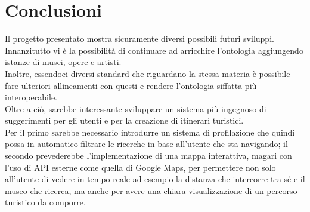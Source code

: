 \documentclass[12pt]{article}
\begin{document}
\section{Conclusioni}
Il progetto presentato mostra sicuramente diversi possibili futuri sviluppi. Innanzitutto vi è la possibilità di continuare ad arricchire l'ontologia
aggiungendo istanze di musei, opere e artisti.\\
Inoltre, essendoci diversi standard che riguardano la stessa materia è possibile fare ulteriori
allineamenti con questi e rendere l'ontologia siffatta più interoperabile. \\
Oltre a ciò, sarebbe interessante sviluppare un sistema più ingegnoso di suggerimenti per gli utenti e per la creazione di itinerari turistici.\\
Per il primo sarebbe necessario introdurre un sistema di profilazione che quindi possa in automatico filtrare le ricerche in base all'utente che sta navigando;
il secondo prevederebbe l'implementazione di una mappa interattiva, magari con l'uso di API esterne come quella di Google Maps, per permettere non solo all'utente
di vedere in tempo reale ad esempio la distanza che intercorre tra sé e il museo che ricerca, ma anche per avere una chiara visualizzazione di un percorso turistico
da comporre.
\newpage
\printbibliography
\end{document}
